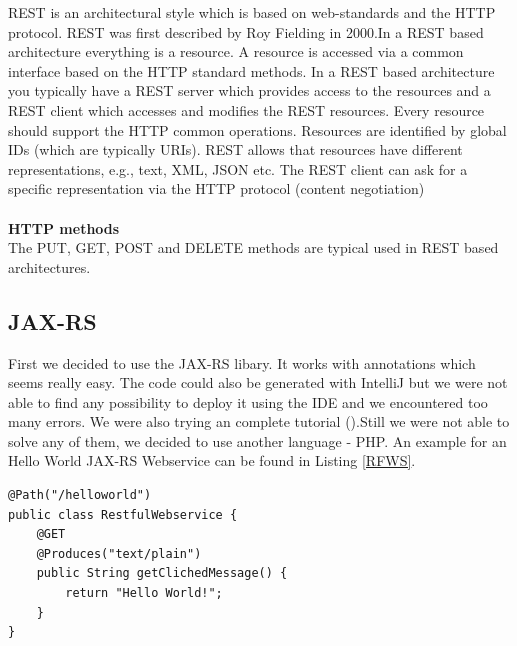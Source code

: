 \documentclass[12pt]{article}
\begin{document}
REST is an architectural style which is based on web-standards and the HTTP protocol. REST was first described by Roy Fielding in 2000.In a REST based architecture everything is a resource. A resource is accessed via a common interface based on the HTTP standard methods. In a REST based architecture you typically have a REST server which provides access to the resources and a REST client which accesses and modifies the REST resources. Every resource should support the HTTP common operations. Resources are identified by global IDs (which are typically URIs). REST allows that resources have different representations, e.g., text, XML, JSON etc. The REST client can ask for a specific representation via the HTTP protocol (content negotiation)  \cite{vogella}
\\\\
\textbf{HTTP methods} \\
The PUT, GET, POST and DELETE methods are typical used in REST based architectures.
 \cite{vogella}
\subsection{JAX-RS}
First we decided to use the JAX-RS libary. It works with annotations which seems really easy.
The code could also be generated with IntelliJ but we were not able to find any possibility to deploy it using the IDE and we encountered too many errors. We were also trying an complete tutorial (\cite{vogella}).Still we were not able to solve any of them, we decided to use another language - PHP. An example for an Hello World JAX-RS Webservice can be found in Listing \ref{RFWS}.
\begin{lstlisting}[caption=Restful Webservice, label=RFWS]
@Path("/helloworld")
public class RestfulWebservice {
    @GET
    @Produces("text/plain")
    public String getClichedMessage() {
        return "Hello World!";
    }
}
\end{lstlisting}
\end{document}
